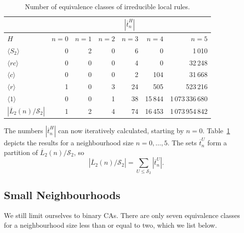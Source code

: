 \documentclass[a4paper]{article}
\begin{document}
\begin{table}
\begin{center}
\caption{Number of equivalence classes of irreducible local rules.}
\label{tab:s2_fs}
\begin{tabular}{|l|r|r|r|r|r|r|}
\hline
       & \multicolumn{6}{|c|}{$|\overline{t}^H_n|$} \\ \hline
$H$    & $n=0$ & $n=1$ & $n=2$ & $n=3$ & $n=4$ & $n=5$ \\ \hline
$\langle S_2 \rangle$                   & 0 & 2 & 0 &  6 &       0 & 1\,010 \\ \hline
$\langle rc \rangle$                            & 0 & 0 & 0 &  4 &       0 & 32\,248 \\ \hline
$\langle c \rangle$                             & 0 & 0 & 0 &  2 &     104 & 31\,668 \\ \hline
$\langle r \rangle$                             & 1 & 0 & 3 & 24 &     505 & 523\,216 \\ \hline
$\langle 1 \rangle$                             & 0 & 0 & 1 & 38 & 15\,844 & 1\,073\,336\,680 \\ \hline
$|\overline{L}_2(n)/\mathcal{S}_2|$     & 1 & 2 & 4 & 74 & 16\,453 & 1\,073\,954\,842 \\ \hline
\end{tabular}
\end{center}
\end{table}

The numbers $|\overline{t}^H_n|$ can now iteratively calculated, starting by $n=0$.
Table~\ref{tab:s2_fs} depicts the results for a neighbourhood size $n=0, \ldots, 5$.
The sets $\overline{t}^U_n$ form a partition of $\overline{L}_2(n) / \mathcal{S}_2$, so
\[
|\overline{L}_2(n) / \mathcal{S}_2| = \sum_{U \le \mathcal{S}_2} |\overline{t}^U_n|.
\]


\subsection{Small Neighbourhoods}

We still limit ourselves to binary CAs.
There are only seven equivalence classes for a neighbourhood size less than or equal to two, which we
list below.
\end{document}
